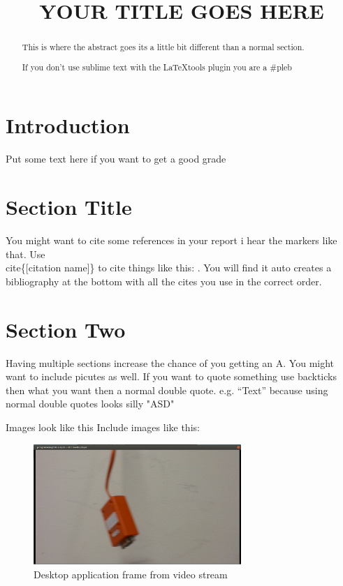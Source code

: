 \documentclass{article}
\title{YOUR TITLE GOES HERE}
\begin{document}


\maketitle



\begin{abstract}
This is where the abstract goes its a little bit different than a normal section.


If you don't use sublime text with the \LaTeX tools plugin you are a \#pleb
\end{abstract}



\section{Introduction}

Put some text here if you want to get a good grade


\section{Section Title}
You might want to cite some references in your report i hear the markers like that.
Use \\cite\{[citation name]\} to cite things like this: \cite{coachseye} \cite{kinovea}.
You will find it auto creates a bibliography at the bottom with all the cites you use in the correct order.

\clearpage

\section{Section Two}
Having multiple sections increase the chance of you getting an A.
You might want to include picutes as well.
If you want to quote something use backticks then what you want then a normal double quote.
e.g. ``Text'' because using normal double quotes looks silly "ASD"

Images look like this
Include images like this:
\begin{figure}[!h]
\centerline{\includegraphics[height=1.8in]{ss1}}
\caption{Desktop application frame from video stream}
\label{fig:rawFrame}
\end{figure}
\end{document}
